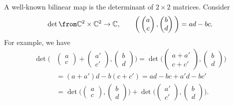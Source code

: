 \documentclass[a4paper,oneside, 12pt]{amsart}
\begin{document}
\begin{example}
  A well-known bilinear map is the determinant of \(2 \times 2\) matrices.
  Consider
  \begin{equation*}
    \det \from \mathbb{C}^{2} \times \mathbb{C}^{2} \to \mathbb{C}, \qquad \bigg(
    \begin{pmatrix}
      a \\ c
    \end{pmatrix},
    \begin{pmatrix}
      b \\ d
    \end{pmatrix}
    \bigg)
    = ad - bc.
  \end{equation*}
  For example, we have
  \begin{align*}
    \det \bigg(
    &
      \begin{pmatrix}
        a \\ c
      \end{pmatrix}
      +
      \begin{pmatrix}
        a' \\ c'
      \end{pmatrix},
      \begin{pmatrix}
        b \\ d
      \end{pmatrix}
      \bigg)
      =
      \det \bigg(
      \begin{pmatrix}
        a + a'  \\ c + c'
      \end{pmatrix},
      \begin{pmatrix}
        b \\ d
      \end{pmatrix}
      \bigg)\\
    & = (a+ a')d - b(c + c') = ad - bc + a'd - bc' \\
    & =
      \det \bigg(
      \begin{pmatrix}
        a \\ c
      \end{pmatrix},
      \begin{pmatrix}
        b \\ d
      \end{pmatrix}\bigg)
      +
      \det \bigg(
      \begin{pmatrix}
        a' \\ c'
      \end{pmatrix},
      \begin{pmatrix}
        b \\ d
      \end{pmatrix}\bigg).
  \end{align*}
\end{example}
\end{document}
